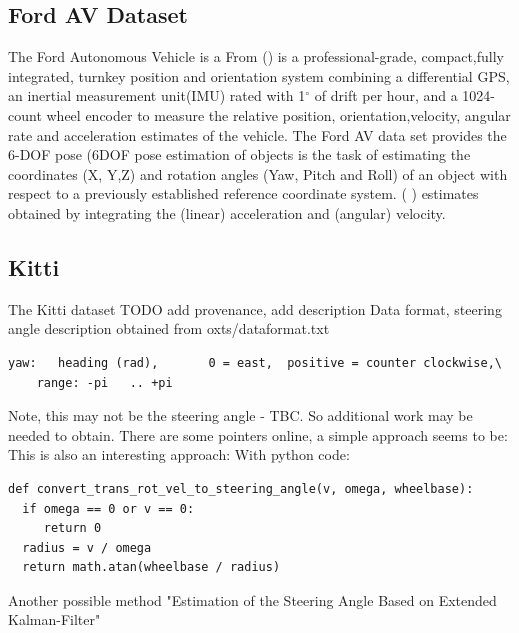\subsection{Ford AV Dataset}
The Ford Autonomous Vehicle is a 
From %
 (\cite{Applanix}) is a professional-grade, compact,fully  integrated,  turnkey  position  and  orientation  system combining a differential GPS, an inertial measurement unit(IMU)  rated  with  1$^{\circ}$ of  drift  per  hour,  and  a  1024-count wheel encoder to measure the relative position, orientation,velocity,  angular  rate  and  acceleration  estimates  of  the vehicle. The Ford AV data set provides the 6-DOF pose (6DOF pose estimation of objects is the task of estimating the coordinates (X, Y,Z) and rotation angles (Yaw, Pitch and Roll) of an object with respect to a previously established reference coordinate system. (\cite{7005077} ) estimates obtained by integrating the (linear) acceleration and (angular) velocity.


\subsection{Kitti}

The Kitti dataset TODO add provenance, add description
Data format, steering angle description obtained from oxts/dataformat.txt 
\begin{verbatim}
yaw:   heading (rad),       0 = east,  positive = counter clockwise,\
    range: -pi   .. +pi
\end{verbatim}
Note, this may not be the steering angle - TBC. So additional work may be needed to obtain.
There are some pointers online, a simple approach seems to be:
This is also an interesting approach:
With python code:
\begin{verbatim}
def convert_trans_rot_vel_to_steering_angle(v, omega, wheelbase):
  if omega == 0 or v == 0:
     return 0
  radius = v / omega
  return math.atan(wheelbase / radius)    
\end{verbatim}
Another possible method "Estimation of the Steering Angle Based on Extended Kalman-Filter"  


